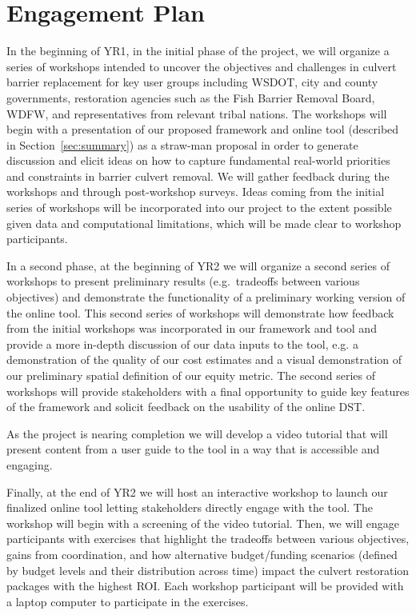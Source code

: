 \documentclass[12pt]{elsarticle}
\begin{document}
\section{Engagement Plan}\label{sec:engage} %

In the beginning of YR1, in the initial phase of the project, we will organize a series of workshops intended to uncover the objectives and challenges in culvert barrier replacement for key user groups including WSDOT, city and county governments, restoration agencies such as the Fish Barrier Removal Board, WDFW, and representatives from relevant tribal nations. The workshops will begin with a presentation of our proposed framework and online tool (described in Section~\ref{sec:summary}) as a straw-man proposal in order to generate discussion and elicit ideas on how to capture fundamental real-world priorities and constraints in barrier culvert removal. We will gather feedback during the workshops and through post-workshop surveys. Ideas coming from the initial series of workshops will be incorporated into our project to the extent possible given data and computational limitations, which will be made clear to workshop participants.

In a second phase, at the beginning of YR2 we will organize a second series of workshops to present preliminary results (e.g.\ tradeoffs between various objectives) and demonstrate the functionality of a preliminary working version of the online tool. This second series of workshops will demonstrate how feedback from the initial workshops was incorporated in our framework and tool and provide a more in-depth discussion of our data inputs to the tool, e.g. a demonstration of the quality of our cost estimates and a visual demonstration of our preliminary spatial definition of our equity metric. The second series of workshops will provide stakeholders with a final opportunity to guide key features of the framework and solicit feedback on the usability of the online DST.

As the project is nearing completion we will develop a video tutorial that will present content from a user guide to the tool in a way that is accessible and engaging. 

Finally, at the end of YR2 we will host an interactive workshop to launch our finalized online tool letting stakeholders directly engage with the tool. The workshop will begin with a screening of the video tutorial. Then, we will engage participants with exercises that highlight the tradeoffs between various objectives, gains from coordination, and how alternative budget/funding scenarios (defined by budget levels and their distribution across time) impact the culvert restoration packages with the highest ROI. Each workshop participant will be provided with a laptop computer to participate in the exercises. 
\end{document}
